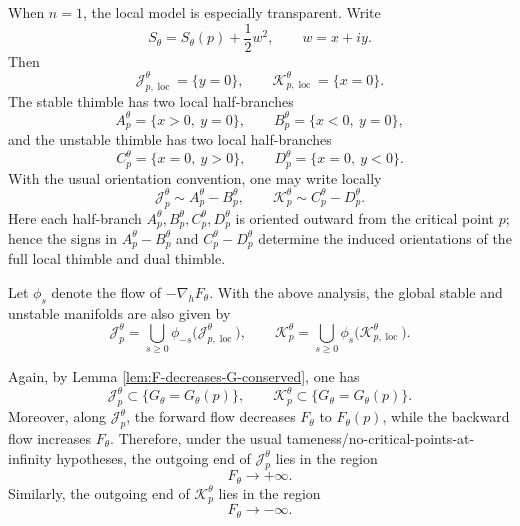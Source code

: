 \documentclass[11pt]{amsart}
\theoremstyle{plain}
\newcommand{\J}{\mathcal J}
\newcommand{\Kk}{\mathcal K}
\begin{document}
When $n=1$, the local model is especially transparent.  Write
\[
S_{\theta}=S_{\theta}(p)+\frac12w^2,
\qquad w=x+iy.
\]
Then
\[
\J_{p,\operatorname{loc}}^\theta=\{y=0\},
\qquad
\Kk_{p,\operatorname{loc}}^\theta=\{x=0\}.
\]
The stable thimble has two local half-branches
\[
A_p^\theta=\{x>0,\ y=0\},
\qquad
B_p^\theta=\{x<0,\ y=0\},
\]
and the unstable thimble has two local half-branches
\[
C_p^\theta=\{x=0,\ y>0\},
\qquad
D_p^\theta=\{x=0,\ y<0\}.
\]
With the usual orientation convention, one may write locally
\begin{equation}\label{orientationthimble}
    \J_p^\theta\sim A_p^\theta-B_p^\theta,
\qquad
\Kk_p^\theta\sim C_p^\theta-D_p^\theta.
\end{equation}
Here each half-branch \(A_p^\theta,B_p^\theta,C_p^\theta,D_p^\theta\) is
oriented outward from the critical point \(p\); hence the signs in
\(A_p^\theta-B_p^\theta\) and \(C_p^\theta-D_p^\theta\) determine the induced
orientations of the full local thimble and dual thimble.




Let $\phi_s$ denote the flow of $-\nabla_h F_{\theta}$. With the above analysis, the global stable and unstable manifolds are also given by
\begin{equation*}\label{eq:flowout-local-disks}
\J_p^\theta
=\bigcup_{s\ge 0}\phi_{-s}\bigl(\J_{p,\operatorname{loc}}^\theta\bigr),
\qquad
\Kk_p^\theta
=\bigcup_{s\ge 0}\phi_{s}\bigl(\Kk_{p,\operatorname{loc}}^\theta\bigr).
\end{equation*}

Again, by Lemma \ref{lem:F-decreases-G-conserved}, one has
\begin{equation*}\label{eq:G-level-global}
\J_p^\theta\subset \{G_{\theta}=G_{\theta}(p)\},
\qquad
\Kk_p^\theta\subset \{G_{\theta}=G_{\theta}(p)\}.
\end{equation*}
Moreover, along $\J_p^\theta$, the forward flow decreases $F_{\theta}$ to $F_{\theta}(p)$, while the backward flow increases $F_{\theta}$.  Therefore, under the usual tameness/no-critical-points-at-infinity hypotheses, the outgoing end of $\J_p^\theta$ lies in the region
\[
F_{\theta}\to +\infty.
\]
Similarly, the outgoing end of $\Kk_p^\theta$ lies in the region
\[
F_{\theta}\to -\infty.
\]
\end{document}
